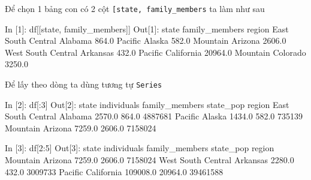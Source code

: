 \documentclass[
]{book}
\newenvironment{Shaded}{\begin{snugshade}}{\end{snugshade}}
\newcommand{\DecValTok}[1]{\textcolor[rgb]{0.00,0.00,0.81}{#1}}
\newcommand{\FloatTok}[1]{\textcolor[rgb]{0.00,0.00,0.81}{#1}}
\newcommand{\NormalTok}[1]{#1}
\newcommand{\StringTok}[1]{\textcolor[rgb]{0.31,0.60,0.02}{#1}}
\begin{document}
Để chọn 1 bảng con có 2 cột \texttt{{[}\textquotesingle{}state\textquotesingle{},\ \textquotesingle{}family\_members\textquotesingle{}{]}} ta làm như sau

\begin{Shaded}
\begin{Highlighting}[]
\NormalTok{In [}\DecValTok{1}\NormalTok{]: df[[}\StringTok{\textquotesingle{}state\textquotesingle{}}\NormalTok{, }\StringTok{\textquotesingle{}family\_members\textquotesingle{}}\NormalTok{]]}
\NormalTok{Out[}\DecValTok{1}\NormalTok{]:}
\NormalTok{                         state  family\_members}
\NormalTok{region                                        }
\NormalTok{East South Central     Alabama           }\FloatTok{864.0}
\NormalTok{Pacific                 Alaska           }\FloatTok{582.0}
\NormalTok{Mountain               Arizona          }\FloatTok{2606.0}
\NormalTok{West South Central    Arkansas           }\FloatTok{432.0}
\NormalTok{Pacific             California         }\FloatTok{20964.0}
\NormalTok{Mountain              Colorado          }\FloatTok{3250.0}
\end{Highlighting}
\end{Shaded}

Để lấy theo dòng ta dùng tương tự \texttt{Series}

\begin{Shaded}
\begin{Highlighting}[]
\NormalTok{In [}\DecValTok{2}\NormalTok{]: df[:}\DecValTok{3}\NormalTok{]}
\NormalTok{Out[}\DecValTok{2}\NormalTok{]: }
\NormalTok{                      state  individuals  family\_members  state\_pop}
\NormalTok{region                                                             }
\NormalTok{East South Central  Alabama       }\FloatTok{2570.0}           \FloatTok{864.0}    \DecValTok{4887681}
\NormalTok{Pacific              Alaska       }\FloatTok{1434.0}           \FloatTok{582.0}     \DecValTok{735139}
\NormalTok{Mountain            Arizona       }\FloatTok{7259.0}          \FloatTok{2606.0}    \DecValTok{7158024}

\NormalTok{In [}\DecValTok{3}\NormalTok{]: df[}\DecValTok{2}\NormalTok{:}\DecValTok{5}\NormalTok{]}
\NormalTok{Out[}\DecValTok{3}\NormalTok{]:}
\NormalTok{                         state  individuals  family\_members  state\_pop}
\NormalTok{region                                                                }
\NormalTok{Mountain               Arizona       }\FloatTok{7259.0}          \FloatTok{2606.0}    \DecValTok{7158024}
\NormalTok{West South Central    Arkansas       }\FloatTok{2280.0}           \FloatTok{432.0}    \DecValTok{3009733}
\NormalTok{Pacific             California     }\FloatTok{109008.0}         \FloatTok{20964.0}   \DecValTok{39461588}
\end{Highlighting}
\end{Shaded}
\end{document}
